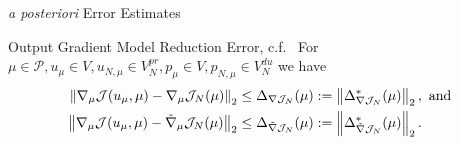 \begin{frame}{\textit{a posteriori} Error Estimates}
{\begin{block}{Output Gradient Model Reduction Error, c.f.~\cite{Qian2017, Keil2021}}
            For $\mu \in \mathcal{P}, u_\mu \in V, u_{N, \mu} \in V_N^{pr}, p_\mu \in V, p_{N, \mu} \in V_N^{du}$ we have
            \begin{align*}
                \norm[2]{\nabla_\mu \mathcal{J}(u_\mu, \mu) - \nabla_\mu \mathcal{J}_N(\mu)} &\leq \Delta_{\nabla \mathcal{J}_N}(\mu) := \norm[2]{\Delta^\ast_{\nabla \mathcal{J}_N}(\mu)}, \text{ and} \\
                \norm[2]{\nabla_\mu \mathcal{J}(u_\mu, \mu) - \tilde{\nabla}_\mu \mathcal{J}_N(\mu)} &\leq \Delta_{\tilde{\nabla} \mathcal{J}_N}(\mu) := \norm[2]{\Delta^\ast_{\tilde{\nabla} \mathcal{J}_N}(\mu)}.
            \end{align*}
        \end{block}
    }
\end{frame}